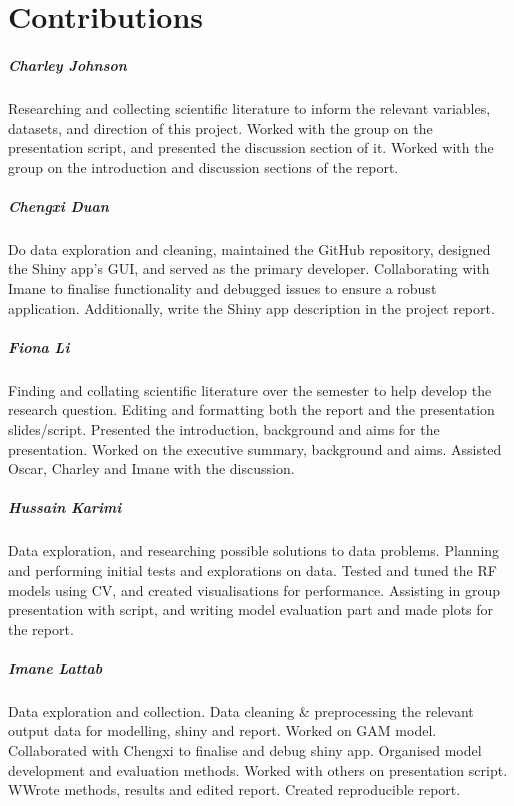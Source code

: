 \documentclass[letterpaper,9pt,twocolumn,twoside,]{pinp}
\begin{document}
\newpage

\section{Contributions}\label{contributions}

\subparagraph{Charley Johnson}\label{charley-johnson}

Researching and collecting scientific literature to inform the relevant
variables, datasets, and direction of this project. Worked with the
group on the presentation script, and presented the discussion section
of it. Worked with the group on the introduction and discussion sections
of the report.

\subparagraph{Chengxi Duan}\label{chengxi-duan}

Do data exploration and cleaning, maintained the GitHub repository,
designed the Shiny app's GUI, and served as the primary developer.
Collaborating with Imane to finalise functionality and debugged issues
to ensure a robust application. Additionally, write the Shiny app
description in the project report.

\subparagraph{Fiona Li}\label{fiona-li}

Finding and collating scientific literature over the semester to help
develop the research question. Editing and formatting both the report
and the presentation slides/script. Presented the introduction,
background and aims for the presentation. Worked on the executive
summary, background and aims. Assisted Oscar, Charley and Imane with the
discussion.

\subparagraph{Hussain Karimi}\label{hussain-karimi}

Data exploration, and researching possible solutions to data problems.
Planning and performing initial tests and explorations on data. Tested
and tuned the RF models using CV, and created visualisations for
performance. Assisting in group presentation with script, and writing
model evaluation part and made plots for the report.

\subparagraph{Imane Lattab}\label{imane-lattab}

Data exploration and collection. Data cleaning \& preprocessing the
relevant output data for modelling, shiny and report. Worked on GAM
model. Collaborated with Chengxi to finalise and debug shiny app.
Organised model development and evaluation methods. Worked with others
on presentation script. WWrote methods, results and edited report.
Created reproducible report.
\end{document}
